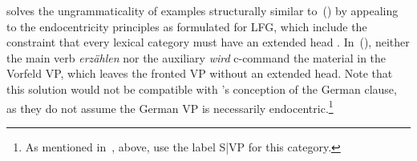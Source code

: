 \documentclass[output=paper,hidelinks]{langscibook}
\begin{document}
  \begin{exe}
  \ex
  \begin{xlist}

\end{xlist}
\end{exe}

\citet[§3.3]{Berman2003} solves the ungrammaticality of examples
structurally similar to~() by appealing to the endocentricity
principles as formulated for LFG, which include the constraint that
every lexical category must have an extended head
\citep[§7.2]{BresnanEtAl2016}. In~(), neither the main verb
\textit{erzählen} nor the auxiliary \textit{wird} c-command the
material in the Vorfeld VP, which leaves the fronted VP without an
extended head. Note that this solution would not be compatible with
\citeauthor{ZaenenKaplan2002:Subsumption}'s conception of the German
clause, as they do not assume the German VP is necessarily
endocentric.\footnote{As mentioned in~, above,
\citeauthor{ZaenenKaplan2002:Subsumption} use the label S|VP for this
category.}
\end{document}
